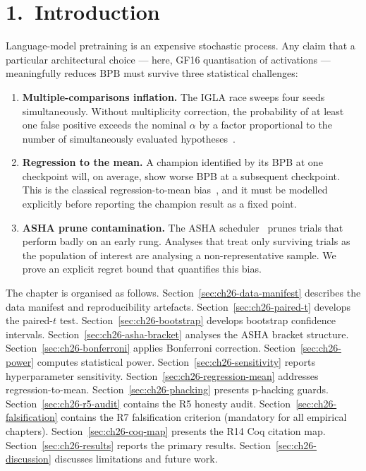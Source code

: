 \section{1.\ Introduction}\label{sec:ch26-intro}

Language-model pretraining is an expensive stochastic process.  Any claim
that a particular architectural choice --- here, GF16 quantisation of
activations --- meaningfully reduces \(\mathrm{BPB}\) must survive three
statistical challenges:

\begin{enumerate}
\item \textbf{Multiple-comparisons inflation.}
  The IGLA race sweeps four seeds simultaneously.  Without multiplicity
  correction, the probability of at least one false positive exceeds the
  nominal \(\alpha\) by a factor proportional to the number of
  simultaneously evaluated hypotheses~\cite{wasserman2004statistics}.

\item \textbf{Regression to the mean.}
  A champion identified by its BPB at one checkpoint will, on average,
  show worse BPB at a subsequent checkpoint.  This is the classical
  regression-to-mean bias~\cite{casella2002statistical}, and it must be
  modelled explicitly before reporting the champion result as a fixed point.

\item \textbf{ASHA prune contamination.}
  The ASHA scheduler~\cite{li2018hyperband} prunes trials that perform
  badly on an early rung.  Analyses that treat only surviving trials as
  the population of interest are analysing a non-representative sample.
  We prove an explicit regret bound that quantifies this bias.
\end{enumerate}

\noindent
The chapter is organised as follows.
Section~\ref{sec:ch26-data-manifest} describes the data manifest and
reproducibility artefacts.
Section~\ref{sec:ch26-paired-t} develops the paired-\(t\) test.
Section~\ref{sec:ch26-bootstrap} develops bootstrap confidence intervals.
Section~\ref{sec:ch26-asha-bracket} analyses the ASHA bracket structure.
Section~\ref{sec:ch26-bonferroni} applies Bonferroni correction.
Section~\ref{sec:ch26-power} computes statistical power.
Section~\ref{sec:ch26-sensitivity} reports hyperparameter sensitivity.
Section~\ref{sec:ch26-regression-mean} addresses regression-to-mean.
Section~\ref{sec:ch26-phacking} presents p-hacking guards.
Section~\ref{sec:ch26-r5-audit} contains the R5 honesty audit.
Section~\ref{sec:ch26-falsification} contains the R7 falsification criterion
(mandatory for all empirical chapters).
Section~\ref{sec:ch26-coq-map} presents the R14 Coq citation map.
Section~\ref{sec:ch26-results} reports the primary results.
Section~\ref{sec:ch26-discussion} discusses limitations and future work.

